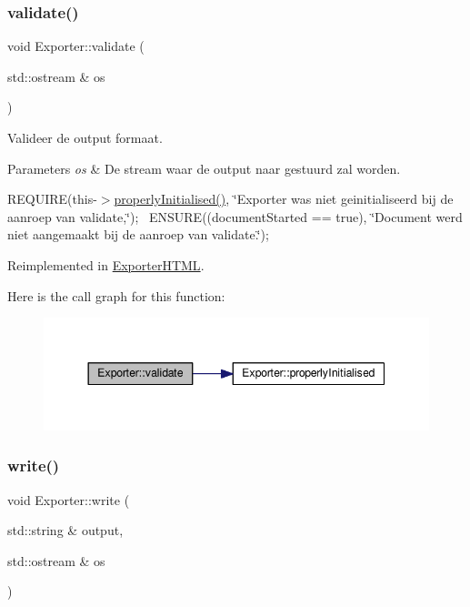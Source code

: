 \subsubsection{\texorpdfstring{validate()}{validate()}}
{\footnotesize\ttfamily void Exporter\+::validate (\begin{DoxyParamCaption}\item[{std\+::ostream \&}]{os }\end{DoxyParamCaption})\hspace{0.3cm}{\ttfamily [virtual]}}



Valideer de output formaat. 


\begin{DoxyParams}{Parameters}
{\em os} & De stream waar de output naar gestuurd zal worden.\\
\hline
\end{DoxyParams}
R\+E\+Q\+U\+I\+RE(this-\/$>$\hyperlink{class_exporter_aafd9df9210aeefd7bb7fd434fc317cf0}{properly\+Initialised()}, \char`\"{}\+Exporter was niet geinitialiseerd bij de aanroep van validate,\char`\"{});~\newline
E\+N\+S\+U\+RE((document\+Started == true), \char`\"{}\+Document werd niet aangemaakt bij de aanroep van validate.\char`\"{});~\newline


Reimplemented in \hyperlink{class_exporter_h_t_m_l_a85662c826df00e13015d8c64325d7fd6}{Exporter\+H\+T\+ML}.

Here is the call graph for this function\+:
\nopagebreak
\begin{figure}[H]
\begin{center}
\leavevmode
\includegraphics[width=344pt]{class_exporter_a6fe3b356471d7f77502b511b5179a4a8_cgraph}
\end{center}
\end{figure}
\mbox{\label{class_exporter_ab3736803133eb727cf87a7306f91eb11}} 
\subsubsection{\texorpdfstring{write()}{write()}}
{\footnotesize\ttfamily void Exporter\+::write (\begin{DoxyParamCaption}\item[{std\+::string \&}]{output,  }\item[{std\+::ostream \&}]{os }\end{DoxyParamCaption})\hspace{0.3cm}{\ttfamily [virtual]}}



